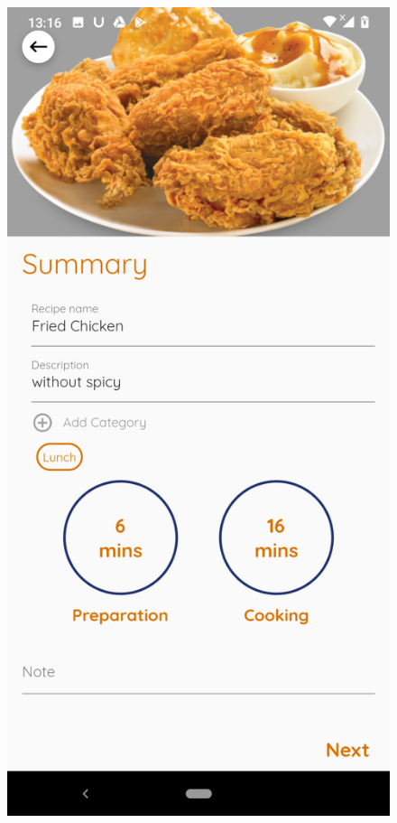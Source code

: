 \documentclass{article}
\begin{document}
\begin{figure}[h!]
        \includegraphics[scale=0.1]{Images/friechicken_order.jpg}

\end{figure}
\end{document}
